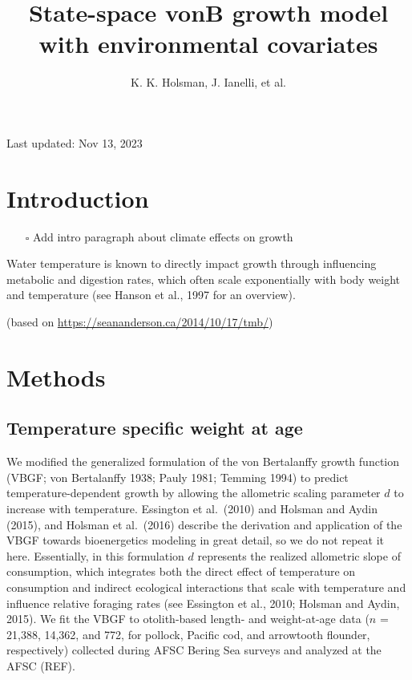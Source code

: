 \documentclass[
]{article}
\title{State-space vonB growth model with environmental covariates}
\author{K. K. Holsman, J. Ianelli, et al.}
\date{}
\providecommand{\tightlist}{%
  \setlength{\itemsep}{0pt}\setlength{\parskip}{0pt}}
\begin{document}
\maketitle

{
\setcounter{tocdepth}{2}
\tableofcontents
}
Last updated: Nov 13, 2023

\hypertarget{introduction}{%
\section{Introduction}\label{introduction}}

\begin{itemize}
\tightlist
\item[$\square$]
  Add intro paragraph about climate effects on growth
\end{itemize}

Water temperature is known to directly impact growth through influencing
metabolic and digestion rates, which often scale exponentially with body
weight and temperature (see Hanson et al., 1997 for an overview).

(based on \url{https://seananderson.ca/2014/10/17/tmb/})

\hypertarget{methods}{%
\section{Methods}\label{methods}}

\hypertarget{temperature-specific-weight-at-age}{%
\subsection{Temperature specific weight at
age}\label{temperature-specific-weight-at-age}}

We modified the generalized formulation of the von Bertalanffy growth
function (VBGF; von Bertalanffy 1938; Pauly 1981; Temming 1994) to
predict temperature-dependent growth by allowing the allometric scaling
parameter \(d\) to increase with temperature. Essington et al.~(2010)
and Holsman and Aydin (2015), and Holsman et al.~(2016) describe the
derivation and application of the VBGF towards bioenergetics modeling in
great detail, so we do not repeat it here. Essentially, in this
formulation \(d\) represents the realized allometric slope of
consumption, which integrates both the direct effect of temperature on
consumption and indirect ecological interactions that scale with
temperature and influence relative foraging rates (see Essington et al.,
2010; Holsman and Aydin, 2015). We fit the VBGF to otolith-based length-
and weight-at-age data (\(n\) = 21,388, 14,362, and 772, for pollock,
Pacific cod, and arrowtooth flounder, respectively) collected during
AFSC Bering Sea surveys and analyzed at the AFSC (REF).
\end{document}
